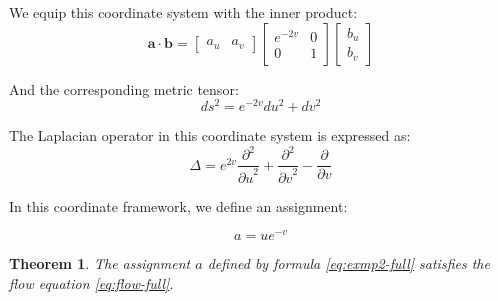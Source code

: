 \documentclass[12pt]{article}
\newtheorem{theorem}{Theorem}[section]
\begin{document}
We equip this coordinate system with the inner product:
$$
\mathbf{a} \cdot \mathbf{b} = \begin{bmatrix} a_u & a_v \end{bmatrix} \begin{bmatrix} e^{-2v} & 0 \\ 0 & 1 \end{bmatrix} \begin{bmatrix} b_u \\ b_v \end{bmatrix}
$$

And the corresponding metric tensor:
$$
ds^2 = e^{-2v} du^2 + dv^2
$$

The Laplacian operator in this coordinate system is expressed as:
$$
\Delta = e^{2v} \frac{\partial^2}{{\partial u}^2} + \frac{\partial^2}{{\partial v}^2} - \frac{\partial}{\partial v}
$$

In this coordinate framework, we define an assignment:

\begin{equation}\label{eq:exmp2-full}
a = u e^{-v}
\end{equation}

\begin{theorem}\label{thm:exmp2-full}
The assignment $a$ defined by formula \eqref{eq:exmp2-full} satisfies the flow equation \eqref{eq:flow-full}.
\end{theorem}
\end{document}
